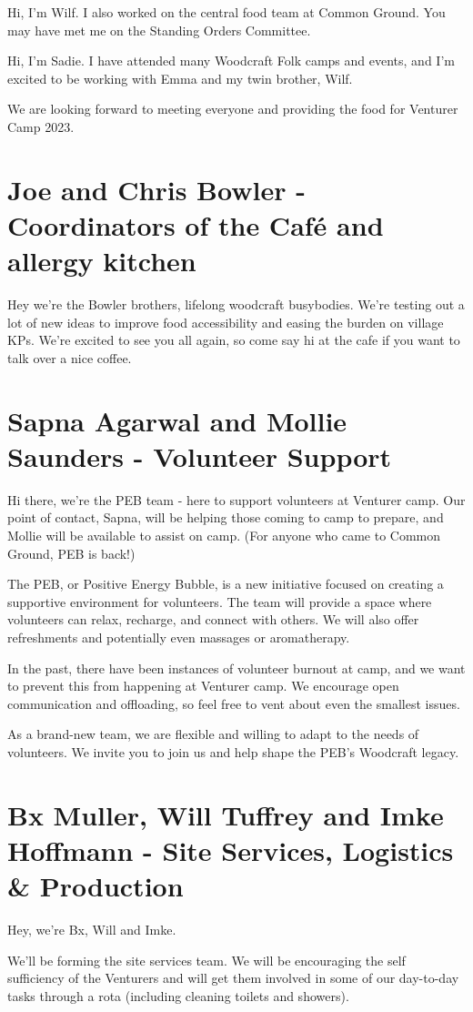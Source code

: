 \documentclass[a4paper, 10pt]{report}
\begin{document}
Hi, I'm Wilf. I also worked on the central food team at Common Ground. You may have met me on the Standing Orders Committee.

Hi, I'm Sadie. I have attended many Woodcraft Folk camps and events, and I'm excited to be working with Emma and my twin brother, Wilf.

We are looking forward to meeting everyone and providing the food for Venturer Camp 2023.
\section{Joe and Chris Bowler - Coordinators of the Café and allergy kitchen }
Hey we're the Bowler brothers, lifelong woodcraft busybodies. We're testing out a lot of new ideas to improve food accessibility and easing the burden on village KPs. We're excited to see you all again, so come say hi at the cafe if you want to talk over a nice coffee.
\section{Sapna Agarwal and Mollie Saunders - Volunteer Support}
Hi there, we're the PEB team - here to support volunteers at Venturer camp. Our point of contact, Sapna, will be helping those coming to camp to prepare, and Mollie will be available to assist on camp. (For anyone who came to Common Ground, PEB is back!)

The PEB, or Positive Energy Bubble, is a new initiative focused on creating a supportive environment for volunteers. The team will provide a space where volunteers can relax, recharge, and connect with others. We will also offer refreshments and potentially even massages or aromatherapy.

In the past, there have been instances of volunteer burnout at camp, and we want to prevent this from happening at Venturer camp. We encourage open communication and offloading, so feel free to vent about even the smallest issues.

As a brand-new team, we are flexible and willing to adapt to the needs of volunteers. We invite you to join us and help shape the PEB's Woodcraft legacy.

\section{Bx Muller, Will Tuffrey and Imke Hoffmann - Site Services, Logistics \& Production}
Hey, we're Bx, Will and Imke.

We'll be forming the site services team. We will be encouraging the self sufficiency of the Venturers and will get them involved in some of our day-to-day tasks through a rota (including cleaning toilets and showers).
\end{document}
